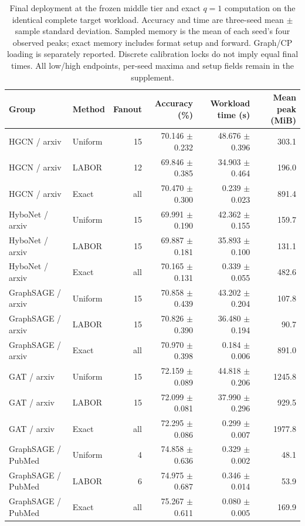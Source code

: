 \begin{table}[t]
\caption{Final deployment at the frozen middle tier and exact $q=1$ computation on the identical complete target workload. Accuracy and time are three-seed mean $\pm$ sample standard deviation. Sampled memory is the mean of each seed's four observed peaks; exact memory includes format setup and forward. Graph/CP loading is separately reported. Discrete calibration locks do not imply equal final times. All low/high endpoints, per-seed maxima and setup fields remain in the supplement.}
\label{tab:final-deployment}
\centering
\small
\begin{tabular}{llrrrr}
\toprule
Group & Method & Fanout & Accuracy (\%) & Workload time (s) & Mean peak (MiB) \\
\midrule
HGCN / arxiv & Uniform & 15 & 70.146 $\pm$ 0.232 & 48.676 $\pm$ 0.396 & 303.1 \\
HGCN / arxiv & LABOR & 12 & 69.846 $\pm$ 0.385 & 34.903 $\pm$ 0.464 & 196.0 \\
HGCN / arxiv & Exact & all & 70.470 $\pm$ 0.300 & 0.239 $\pm$ 0.023 & 891.4 \\
HyboNet / arxiv & Uniform & 15 & 69.991 $\pm$ 0.190 & 42.362 $\pm$ 0.155 & 159.7 \\
HyboNet / arxiv & LABOR & 15 & 69.887 $\pm$ 0.181 & 35.893 $\pm$ 0.100 & 131.1 \\
HyboNet / arxiv & Exact & all & 70.165 $\pm$ 0.131 & 0.339 $\pm$ 0.055 & 482.6 \\
GraphSAGE / arxiv & Uniform & 15 & 70.858 $\pm$ 0.439 & 43.202 $\pm$ 0.204 & 107.8 \\
GraphSAGE / arxiv & LABOR & 15 & 70.826 $\pm$ 0.390 & 36.480 $\pm$ 0.194 & 90.7 \\
GraphSAGE / arxiv & Exact & all & 70.970 $\pm$ 0.398 & 0.184 $\pm$ 0.006 & 891.0 \\
GAT / arxiv & Uniform & 15 & 72.159 $\pm$ 0.089 & 44.818 $\pm$ 0.206 & 1245.8 \\
GAT / arxiv & LABOR & 15 & 72.099 $\pm$ 0.081 & 37.990 $\pm$ 0.296 & 929.5 \\
GAT / arxiv & Exact & all & 72.295 $\pm$ 0.086 & 0.299 $\pm$ 0.007 & 1977.8 \\
GraphSAGE / PubMed & Uniform & 4 & 74.858 $\pm$ 0.636 & 0.329 $\pm$ 0.002 & 48.1 \\
GraphSAGE / PubMed & LABOR & 6 & 74.975 $\pm$ 0.687 & 0.346 $\pm$ 0.014 & 53.9 \\
GraphSAGE / PubMed & Exact & all & 75.267 $\pm$ 0.611 & 0.080 $\pm$ 0.005 & 169.9 \\
\bottomrule
\end{tabular}
\end{table}
